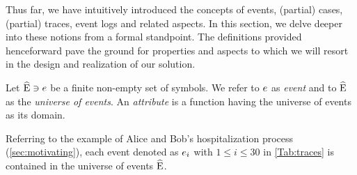 \begin{newj}
Thus far, we have intuitively introduced the concepts of events, (partial) cases, (partial) traces, event logs and related aspects.
In this section, we delve deeper into these notions from a formal standpoint. The definitions provided henceforward pave the ground for properties and aspects to which we will resort in the design and realization of our solution.

\begin{definition}[Event]\label{def:evt}
	Let $\widehat{\mathrm{E}} \ni e$ be a finite non-empty set of symbols. We refer to $e$ as \emph{event} and to $\widehat{\mathrm{E}}$ as the \emph{universe of events}.
	An \emph{attribute} is a function having the universe of events as its domain.
\end{definition}
%
Referring to the example of Alice and Bob's hospitalization process (\cref{sec:motivating}), each event denoted as $e_i$ with $1 \leq i \leq 30$ in \cref{Tab:traces} is contained in the universe of events $\widehat{\mathrm{E}}$. 


\end{newj}
